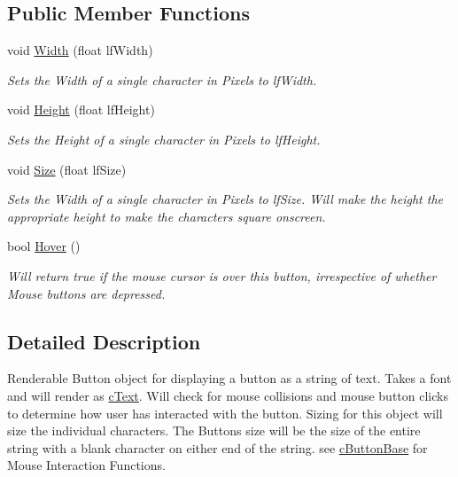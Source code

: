 \subsection*{Public Member Functions}
\begin{DoxyCompactItemize}
\item 
\hypertarget{classc_text_button_a7f46d45c0852a2e60d78996db1830fea}{
void \hyperlink{classc_text_button_a7f46d45c0852a2e60d78996db1830fea}{Width} (float lfWidth)}
\label{classc_text_button_a7f46d45c0852a2e60d78996db1830fea}

\begin{DoxyCompactList}\small\item\em Sets the Width of a single character in Pixels to lfWidth. \end{DoxyCompactList}\item 
\hypertarget{classc_text_button_a2b8e69d02715711770cf6ad685a022cd}{
void \hyperlink{classc_text_button_a2b8e69d02715711770cf6ad685a022cd}{Height} (float lfHeight)}
\label{classc_text_button_a2b8e69d02715711770cf6ad685a022cd}

\begin{DoxyCompactList}\small\item\em Sets the Height of a single character in Pixels to lfHeight. \end{DoxyCompactList}\item 
\hypertarget{classc_text_button_a89fd814570016d1b95b1dedeef43d55a}{
void \hyperlink{classc_text_button_a89fd814570016d1b95b1dedeef43d55a}{Size} (float lfSize)}
\label{classc_text_button_a89fd814570016d1b95b1dedeef43d55a}

\begin{DoxyCompactList}\small\item\em Sets the Width of a single character in Pixels to lfSize. Will make the height the appropriate height to make the characters square onscreen. \end{DoxyCompactList}\item 
\hypertarget{classc_text_button_acba9a18614900289764237319992c0af}{
bool \hyperlink{classc_text_button_acba9a18614900289764237319992c0af}{Hover} ()}
\label{classc_text_button_acba9a18614900289764237319992c0af}

\begin{DoxyCompactList}\small\item\em Will return true if the mouse cursor is over this button, irrespective of whether Mouse buttons are depressed. \end{DoxyCompactList}\end{DoxyCompactItemize}


\subsection{Detailed Description}
Renderable Button object for displaying a button as a string of text. Takes a font and will render as \hyperlink{classc_text}{cText}. Will check for mouse collisions and mouse button clicks to determine how user has interacted with the button. Sizing for this object will size the individual characters. The Buttons size will be the size of the entire string with a blank character on either end of the string. see \hyperlink{classc_button_base}{cButtonBase} for Mouse Interaction Functions. 